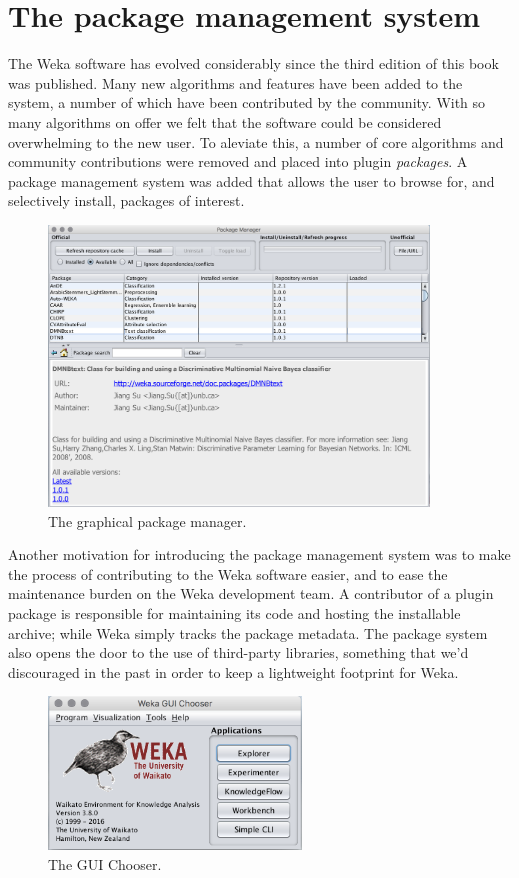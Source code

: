 \section{The package management system}

The Weka software has evolved considerably since the third edition of
this book was published. Many new algorithms and features have been
added to the system, a number of which have been contributed by the
community. With so many algorithms on offer we felt that the software
could be considered overwhelming to the new user. To aleviate this, a
number of core algorithms and community contributions were removed and
placed into plugin \textit{packages}. A package management system was
added that allows the user to browse for, and selectively install,
packages of interest.

\begin{figure}[!th]
\centering
\includegraphics[width=0.9\textwidth]{images/P1.png}
\caption{The graphical package manager.}
\label{fig:package_manager}
\end{figure}

Another motivation for introducing the package management system was
to make the process of contributing to the Weka software easier, and
to ease the maintenance burden on the Weka development team. A
contributor of a plugin package is responsible for maintaining its
code and hosting the installable archive; while Weka simply tracks the
package metadata. The package system also opens the door to the use of
third-party libraries, something that we'd discouraged in the past in
order to keep a lightweight footprint for Weka.

\begin{figure}[!th]
\centering
\includegraphics[width=0.6\textwidth]{images/B_2_3a.png}
\caption{The GUI Chooser.}
\label{fig:gui_chooser}
\end{figure}

